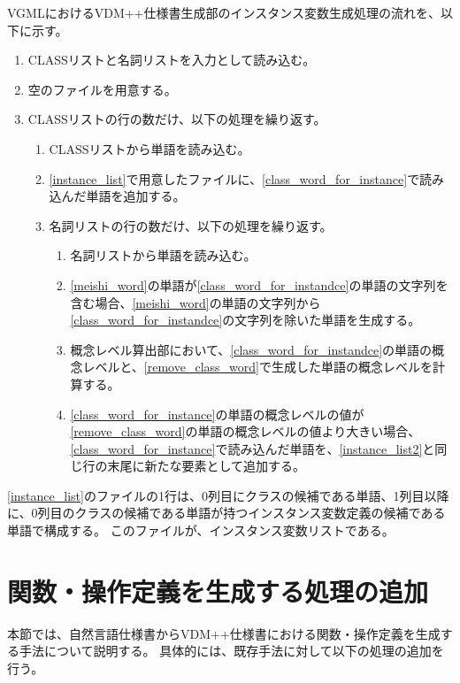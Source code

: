 VGMLにおけるVDM++仕様書生成部のインスタンス変数生成処理の流れを、以下に示す。

\begin{enumerate}
    \item CLASSリストと名詞リストを入力として読み込む。
    \item 空のファイルを用意する。
    \label{instance_list}
    \item CLASSリストの行の数だけ、以下の処理を繰り返す。
        \begin{enumerate}
            \item CLASSリストから単語を読み込む。
            \label{class_word_for_instance}
            \item \ref{instance_list}で用意したファイルに、\ref{class_word_for_instance}で読み込んだ単語を追加する。
            \label{instance_list2}
            \item 名詞リストの行の数だけ、以下の処理を繰り返す。
                \begin{enumerate}
                    \item 名詞リストから単語を読み込む。
                    \label{meishi_word}
                    \item \ref{meishi_word}の単語が\ref{class_word_for_instandce}の単語の文字列を含む場合、\ref{meishi_word}の単語の文字列から\ref{class_word_for_instandce}の文字列を除いた単語を生成する。
                    \label{remove_class_word}
                    \item 概念レベル算出部において、\ref{class_word_for_instandce}の単語の概念レベルと、\ref{remove_class_word}で生成した単語の概念レベルを計算する。
                    \label{calc_concept_class_meishi}
                    \item \ref{class_word_for_instance}の単語の概念レベルの値が\ref{remove_class_word}の単語の概念レベルの値より大きい場合、\ref{class_word_for_instance}で読み込んだ単語を、\ref{instance_list2}と同じ行の末尾に新たな要素として追加する。
                \end{enumerate}
        \end{enumerate}
\end{enumerate}

\ref{instance_list}のファイルの1行は、0列目にクラスの候補である単語、1列目以降に、0列目のクラスの候補である単語が持つインスタンス変数定義の候補である単語で構成する。
このファイルが、インスタンス変数リストである。

\section{関数・操作定義を生成する処理の追加}
本節では、自然言語仕様書からVDM++仕様書における関数・操作定義を生成する手法について説明する。
具体的には、既存手法に対して以下の処理の追加を行う。

